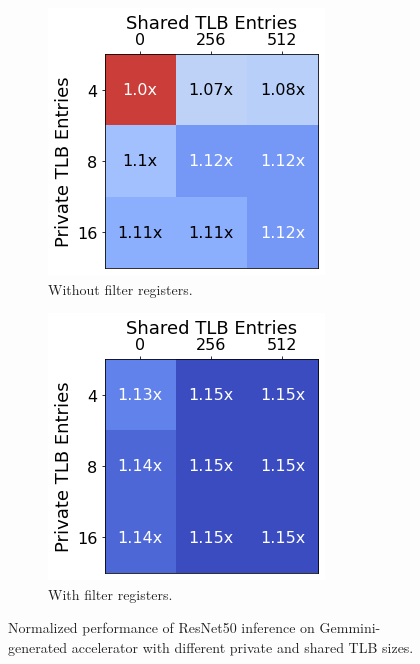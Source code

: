 \begin{figure}
    \centering
    \begin{subfigure}[t]{0.439\linewidth}
        \centering
        \includegraphics[width=\linewidth]{fig/tlb_entries.png}
        \caption{Without filter registers.}
        \label{fig:tlb_wait_cycles}
    \end{subfigure}
    \hfill
    \begin{subfigure}[t]{0.439\linewidth}
        \centering
        \includegraphics[width=\linewidth]{fig/tlb_entries_with_filter.png}
        \caption{With filter registers.}
        \label{fig:tlb_wait_cycles_with_filter}
    \end{subfigure}
    \caption{Normalized performance of ResNet50 inference on Gemmini-generated accelerator with different private and shared TLB sizes.}
    \vspace{-0.2in}
\end{figure}

